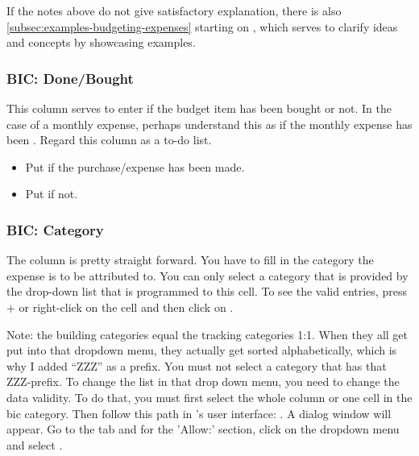 If the notes above do not give satisfactory explanation, there is also \autoref{subsec:examples-budgeting-expenses} starting on , which serves to clarify ideas and concepts by showcasing examples.

\subsubsection{BIC: Done/Bought}
\label{subsubsec:bic-done}

This column serves to enter if the budget item has been bought or not.
In the case of a monthly expense, perhaps understand this as if the monthly expense has been .
Regard this column as a to-do list.
\begin{itemize}
	\item Put  if the purchase/expense has been made.
	\item Put  if not.
\end{itemize}

\subsubsection{BIC: Category}
\label{subsubsec:bic-category}

The column  is pretty straight forward.
You have to fill in the category the expense is to be attributed to.
You can only select a category that is provided by the drop-down list that is programmed to this cell.
To see the valid entries, press +\keystroke{\( \downarrow \)} or right-click on the cell and then click on .

Note: the building categories equal the tracking categories 1:1.
When they all get put into that dropdown menu, they actually get sorted alphabetically, which is why I added ``ZZZ'' as a prefix.
You must not select a category that has that ZZZ-prefix.
To change the list in that drop down menu, you need to change the data validity.
To do that, you must first select the whole column or one cell in the \ac{bic} category. 
Then follow this path in \loc's user interface: \structurenext{}.
A dialog window will appear.
Go to the tab  and for the 'Allow:' section, click on the dropdown menu and select .